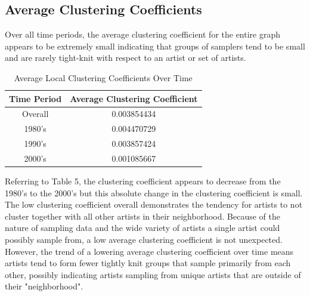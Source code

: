 \documentclass[pageno]{jpaper}
\begin{document}
\subsection{Average Clustering Coefficients}
Over all time periods, the average clustering coefficient for the entire graph appears to be extremely small indicating that groups of samplers tend to be small and are rarely tight-knit with respect to an artist or set of artists.
\begin{table}[H]
\centering
\begin{tabular}{|c|c|}
\hline
\textbf{Time Period} & \textbf{Average Clustering Coefficient} \\ \hline
Overall & 0.003854434 \\ \hline
1980's & 0.004470729 \\ \hline
1990's & 0.003857424 \\ \hline
2000's & 0.001085667 \\ \hline
\end{tabular}
\caption{Average Local Clustering Coefficients Over Time}
\label{table:table5}
\end{table}
Referring to Table 5, the clustering coefficient appears to decrease from the 1980's to the 2000's but this absolute change in the clustering coefficient is small. The low clustering coefficient overall demonstrates the tendency for artists to not cluster together with all other artists in their neighborhood. Because of the nature of sampling data and the wide variety of artists a single artist could possibly sample from, a low average clustering coefficient is not unexpected. However, the trend of a lowering average clustering coefficient over time means artists tend to form fewer tightly knit groups that sample primarily from each other, possibly indicating artists sampling from unique artists that are outside of their "neighborhood".
\end{document}

